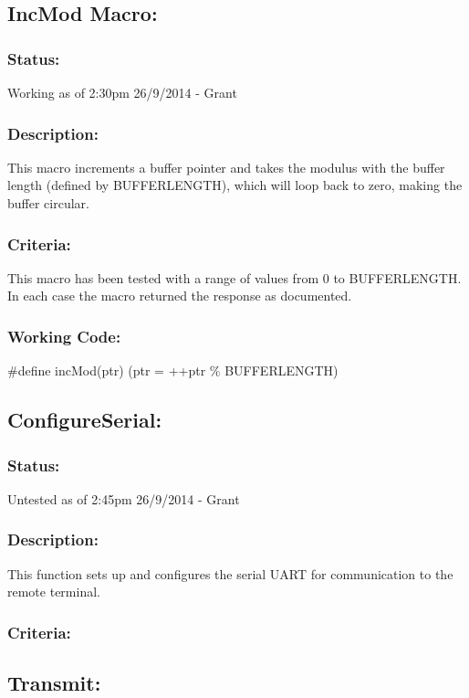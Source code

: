 \documentclass[]{article}
\begin{document}
\subsection{IncMod Macro:}
\subsubsection{Status:}
Working as of 2:30pm 26/9/2014 - Grant

\subsubsection{Description:}
This macro increments a buffer pointer and takes the modulus with the buffer length (defined by BUFFERLENGTH), which will loop back to zero, making the buffer circular.

\subsubsection{Criteria:}
This macro has been tested with a range of values from 0 to BUFFERLENGTH. In each case the macro returned the response as documented.

\subsubsection{Working Code:}
\#define incMod(ptr) (ptr = ++ptr \% BUFFERLENGTH)

\subsection{ConfigureSerial:}
\subsubsection{Status:}
Untested as of 2:45pm 26/9/2014 - Grant

\subsubsection{Description:}
This function sets up and configures the serial UART for communication to the remote terminal.

\subsubsection{Criteria:}

\subsection{Transmit:}
\end{document}
